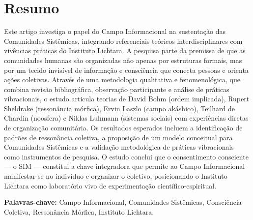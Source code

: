 \section*{Resumo}

Este artigo investiga o papel do Campo Informacional na sustentação das Comunidades Sistêmicas, integrando referenciais teóricos interdisciplinares com vivências práticas do Instituto Lichtara. A pesquisa parte da premissa de que as comunidades humanas são organizadas não apenas por estruturas formais, mas por um tecido invisível de informação e consciência que conecta pessoas e orienta ações coletivas. Através de uma metodologia qualitativa e fenomenológica, que combina revisão bibliográfica, observação participante e análise de práticas vibracionais, o estudo articula teorias de David Bohm (ordem implicada), Rupert Sheldrake (ressonância mórfica), Ervin Laszlo (campo akáshico), Teilhard de Chardin (noosfera) e Niklas Luhmann (sistemas sociais) com experiências diretas de organização comunitária. Os resultados esperados incluem a identificação de padrões de ressonância coletiva, a proposição de um modelo conceitual para Comunidades Sistêmicas e a validação metodológica de práticas vibracionais como instrumentos de pesquisa. O estudo conclui que o consentimento consciente — o SIM — constitui a chave integradora que permite ao Campo Informacional manifestar-se no indivíduo e organizar o coletivo, posicionando o Instituto Lichtara como laboratório vivo de experimentação científico-espiritual.

\textbf{Palavras-chave:} Campo Informacional, Comunidades Sistêmicas, Consciência Coletiva, Ressonância Mórfica, Instituto Lichtara.

\newpage